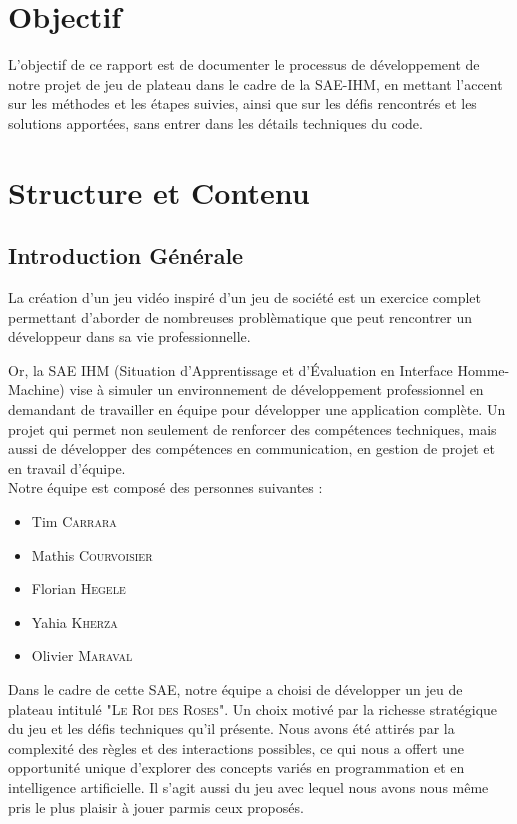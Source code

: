 \chapter{Objectif}

L'objectif de ce rapport est de documenter le processus de développement de notre projet de jeu de plateau dans le cadre de la SAE-IHM, en mettant l'accent sur les méthodes et les étapes suivies, ainsi que sur les défis rencontrés et les solutions apportées, sans entrer dans les détails techniques du code.

\chapter{Structure et Contenu}

\section{Introduction Générale}

La création d’un jeu vidéo inspiré d’un jeu de société est un exercice complet permettant d’aborder de nombreuses problèmatique que peut rencontrer un développeur dans sa vie professionnelle.

Or, la SAE IHM (Situation d'Apprentissage et d'Évaluation en Interface Homme-Machine) vise à simuler un environnement de développement professionnel en demandant de travailler en équipe pour développer une application complète.
Un projet qui permet non seulement de renforcer des compétences techniques, mais aussi de développer des compétences en communication, en gestion de projet et en travail d'équipe. \\

Notre équipe est composé des personnes suivantes :
\begin{itemize}
    \item Tim \textsc{Carrara}
    \item Mathis \textsc{Courvoisier}
    \item Florian \textsc{Hegele}
    \item Yahia \textsc{Kherza}
    \item Olivier \textsc{Maraval}\\
\end{itemize}

Dans le cadre de cette SAE, notre équipe a choisi de développer un jeu de plateau intitulé "\textsc{Le Roi des Roses}".
Un choix motivé par la richesse stratégique du jeu et les défis techniques qu'il présente.
Nous avons été attirés par la complexité des règles et des interactions possibles, ce qui nous a offert une opportunité unique d'explorer des concepts variés en programmation et en intelligence artificielle.
Il s’agit aussi du jeu avec lequel nous avons nous même pris le plus plaisir à jouer parmis ceux proposés.\\

